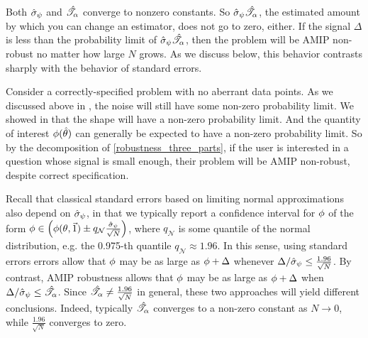 %
Both $\hat{\sigma}_{\psi}$ and $\hat{\mathscr{T}}_\alpha$ converge to nonzero constants. So $\hat{\sigma}_{\psi}
\hat{\mathscr{T}}_\alpha$, the estimated amount by which you can change an estimator, does not go
to zero, either. If the signal $\Delta$ is less than the probability limit of
$\hat{\sigma}_{\psi} \hat{\mathscr{T}}_\alpha$, then the problem will be AMIP non-robust no matter how
large $N$ grows. As we discuss below, this behavior contrasts sharply with the
behavior of standard errors.


%
Consider a correctly-specified problem with no aberrant data points. As we
discussed above in  ,
the noise will still have some non-zero probability limit. We showed in
 that the shape will have a non-zero
probability limit. And the quantity of interest $\phi(\hat{\theta})$ can
generally be expected to have a non-zero probability limit. So by the
decomposition of \eqref{robustness_three_parts}, if the user is interested in a
question whose signal is small enough, their problem will be AMIP non-robust,
despite correct specification.


 
%
Recall that classical standard errors based on limiting normal approximations
also depend on $\hat{\sigma}_{\psi}$, in that we typically report a confidence interval
for $\phi$ of the form
%
$\phi \in \left(\phi(\theta, \vec{1}) \pm q_{\mathcal{N}}
\frac{\hat{\sigma}_{\psi}}{\sqrt{N}}  \right)$,
%
where $q_{\mathcal{N}}$ is some quantile of the normal distribution, e.g. the
0.975-th quantile $q_{\mathcal{N}} \approx 1.96$.  In this sense, using standard
errors errors allow that $\phi$ may be as large as $\phi + \Delta$
whenever $\Delta / \hat{\sigma}_{\psi} \le \frac{1.96}{\sqrt{N}}$. By contrast, AMIP
robustness allows that $\phi$ may be as large as $\phi + \Delta$ when
$\Delta / \hat{\sigma}_{\psi} \le \hat{\mathscr{T}}_\alpha$. Since $\hat{\mathscr{T}}_\alpha \ne \frac{1.96}{\sqrt{N}}$ in
general, these two approaches will yield different conclusions.  Indeed,
typically $\hat{\mathscr{T}}_\alpha$ converges to a non-zero constant as $N \rightarrow 0$, while
$\frac{1.96}{\sqrt{N}}$ converges to zero.


